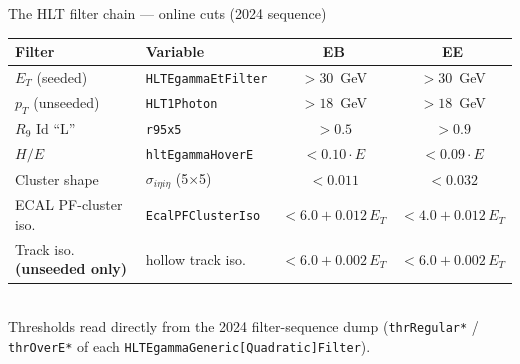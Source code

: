 \documentclass[aspectratio=169,10pt]{beamer}
\newcommand{\RNine}{\ensuremath{R_{9}}}
\newcommand{\gold}[1]{\textcolor{cmsgold}{\textbf{#1}}}
\begin{document}
\begin{frame}{The HLT filter chain --- online cuts (2024 sequence)}
  \centering
  {\footnotesize
  \begin{tabular}{@{}llcc@{}}
    \toprule
    \textbf{Filter} & \textbf{Variable} & \textbf{EB} & \textbf{EE}\\
    \midrule
    $E_{T}$ (seeded)          & \texttt{HLTEgammaEtFilter}      & $>30$~GeV & $>30$~GeV\\
    $p_{T}$ (unseeded)        & \texttt{HLT1Photon}             & $>18$~GeV & $>18$~GeV\\
    \RNine{} Id ``L''         & \texttt{r95x5}                  & $>0.5$ & $>0.9$\\
    $H/E$                     & \texttt{hltEgammaHoverE}        & $<0.10\cdot E$ & $<0.09\cdot E$\\
    Cluster shape             & $\sigma_{i\eta i\eta}$ (5$\times$5) & $<0.011$ & $<0.032$\\
    ECAL PF-cluster iso.      & \texttt{EcalPFClusterIso}       & $<6.0 + 0.012\,E_{T}$ & $<4.0 + 0.012\,E_{T}$\\
    Track iso. \gold{(unseeded only)} & hollow track iso.       & $<6.0 + 0.002\,E_{T}$ & $<6.0 + 0.002\,E_{T}$\\
    \bottomrule
  \end{tabular}}
  \\[8pt]
  {\footnotesize\color{lightgrey}
   Thresholds read directly from the 2024 filter-sequence dump
   (\texttt{thrRegular*} / \texttt{thrOverE*} of each \texttt{HLTEgammaGeneric[Quadratic]Filter}).}
\end{frame}
\end{document}
